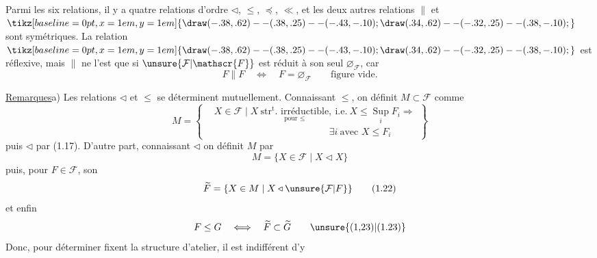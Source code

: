 
Parmi les six relations, il y a quatre relations d'ordre $\triangleleft$, $\leq$, $\preccurlyeq$, $\ll$, et les deux autres relations $\parallel$ et $\mathrel{\tikz[baseline=0pt,x=1em,y=1em]{\draw (-.38,.62)--(.38,.25)--(-.43,-.10); \draw (.34,.62)--(-.32,.25)--(.38,-.10);}}$ sont symétriques.
La relation $\mathrel{\tikz[baseline=0pt,x=1em,y=1em]{\draw (-.38,.62)--(.38,.25)--(-.43,-.10); \draw (.34,.62)--(-.32,.25)--(.38,-.10);}}$ est  réflexive, mais $\parallel$ ne l'est que si $\unsure{\mathcal{F}|\mathscr{F}}$ est réduit à son seul  $\varnothing_{\mathcal{F}}$, car
\[
 F\parallel F \quad\Longleftrightarrow\quad F=\varnothing_{\mathcal{F}}\qquad \text{figure vide.} \tag*{(1.19)}
\]

\uline{Remarques}\quad a) Les relations $\triangleleft$ et $\leq$ se déterminent mutuellement. Connaissant $\leq$, on définit $M\subset\mathcal{F}$ comme
\[
M=\left\{\begin{aligned}
&X\in\mathcal{F}\mid X\
\underset{\text{pour }\leq}{\text{$\mathrm{str}^{\mathrm{t}}$. irréductible}},\
\text{i.e.}\ X\leq\mathop{\mathrm{Sup}}\limits_i F_i\Rightarrow\\
&\hspace{12em}\exists i\ \text{avec }X\leq F_i
\end{aligned}\right\}
\tag*{(1.20)}
\]
puis $\triangleleft$ par (1.17).
 D'autre part, connaissant $\triangleleft$ on définit $M$ par
\[
M=\{X\in\mathcal{F}\mid X\triangleleft X\} \tag*{(1.21)}
\]
puis, pour $F\in\mathcal{F}$, son 
\[
\widetilde F=\{X\in M\mid X\triangleleft\unsure{\mathcal{F}|F}\} \tag*{(1.22)}
\]
et enfin
\[
F\leq G\quad\Longleftrightarrow\quad\widetilde F\subset\widetilde G \tag*{\unsure{(1,23)|(1.23)}}
\]
Donc, pour déterminer \deleted{la structure, il est \unsure{équivalent}}  fixent la structure d'atelier, il est indifférent d'y

